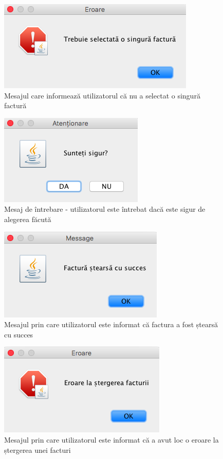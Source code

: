 \documentclass[12pt]{book}
\begin{document}
\begin{figure}[!ht]
	\centering
	\includegraphics{TrebuieSelectata1Factura}
	\caption{Mesajul care informează utilizatorul că nu a selectat o singură factură}
\end{figure}

\begin{figure}[!ht]
	\centering
	\includegraphics{SuntetiSigur}
	\caption{Mesaj de întrebare - utilizatorul este întrebat dacă este sigur de alegerea făcută}
\end{figure}

\begin{figure}[!ht]
	\centering
	\includegraphics{FacturaStearsaSucces}
	\caption{Mesajul prin care utilizatorul este informat că factura a fost ștearsă cu succes}
\end{figure}

\begin{figure}[!ht]
	\centering
	\includegraphics{EroareStergereFactura}
	\caption{Mesajul prin care utilizatorul este informat că a avut loc o eroare la ștergerea unei facturi}
\end{figure}
\end{document}
